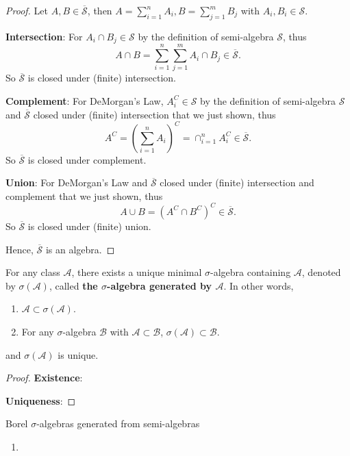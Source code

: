 \begin{proof}
    Let $A,B\in\overline{\mathcal{S}}$, then $A=\sum_{i=1}^{n}A_i, B=\sum_{j=1}^{m}B_j$ with $A_i,B_i\in\mathcal{S}$.\par
    \textbf{Intersection}: For $A_i\cap B_j\in\mathcal{S}$ by the definition of semi-algebra $\mathcal{S}$, thus $$A\cap B=\sum_{i=1}^{n}\sum_{j=1}^{m}A_i\cap B_j\in\overline{\mathcal{S}}.$$ So $\overline{\mathcal{S}}$ is closed under (finite) intersection.\par
    \textbf{Complement}: For DeMorgan's Law, $A_i^C\in\mathcal{S}$ by the definition of semi-algebra $\mathcal{S}$ and $\overline{\mathcal{S}}$ closed under (finite) intersection that we just shown, thus $$A^C=(\sum_{i=1}^{n}A_i)^C=\cap_{i=1}^{n}A_i^C\in\overline{\mathcal{S}}.$$ So $\overline{\mathcal{S}}$ is closed under complement.\par
    \textbf{Union}: For DeMorgan's Law and $\overline{\mathcal{S}}$ closed under (finite) intersection and complement that we just shown, thus $$A\cup B=(A^C\cap B^C)^C\in\overline{\mathcal{S}}.$$ So $\overline{\mathcal{S}}$ is closed under (finite) union.\par
    Hence, $\overline{\mathcal{S}}$ is an algebra.
\end{proof}

\begin{theorem}{}{}
    For any class $\mathcal{A}$, there exists a unique minimal $\sigma$-algebra containing $\mathcal{A}$, denoted by $\sigma(\mathcal{A})$, called \textbf{the $\sigma$-algebra generated by $\mathcal{A}$}. In other words,
    \begin{enumerate}
        \item $\mathcal{A}\subset\sigma(\mathcal{A})$.
        \item For any $\sigma$-algebra $\mathcal{B}$ with $\mathcal{A}\subset\mathcal{B}$, $\sigma(\mathcal{A})\subset\mathcal{B}$.
    \end{enumerate}
    and $\sigma(\mathcal{A})$ is unique.
\end{theorem}

\begin{proof}
    \textbf{Existence}:\par
    \textbf{Uniqueness}:\par
\end{proof}

\begin{example}{Borel $\sigma$-algebras generated from semi-algebras}{}
    \begin{enumerate}
        \item
    \end{enumerate}
\end{example}

